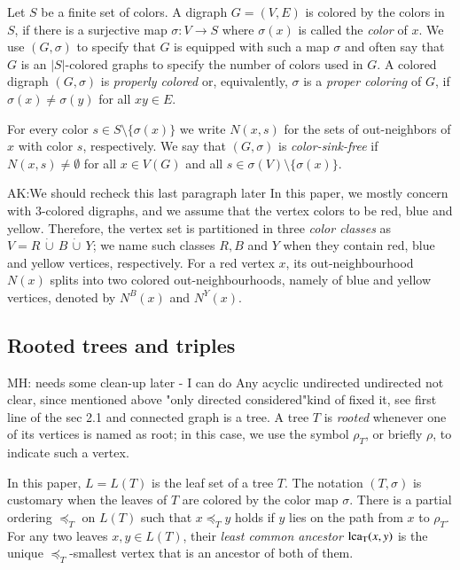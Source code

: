 \documentclass[final,3p,times]{elsarticle}
\newcommand{\TODO}[1]{\begingroup\color{red}#1\endgroup}
\newcommand{\ak}[1]{\begingroup\color{orange}#1\endgroup}
\begin{document}
Let $S$ be a finite set of colors. A digraph $G=(V,E)$ is colored by the colors in $S$,
if there is a surjective map $\sigma: V\to S$ where 
$\sigma(x)$ is called the \emph{color} of $x$. We use $(G,\sigma)$ to specify
that $G$ is equipped with such a map $\sigma$ and often say that $G$ 
is an $|S|$-colored graphs to specify the number of colors used in $G$. 
A colored digraph $(G, \sigma)$ 
is \emph{properly colored} or, equivalently, $\sigma$ is a \emph{proper coloring}
of $G$, if $\sigma(x)\neq \sigma(y)$ for all $xy\in E$. 


For every color $s\in S\setminus \{\sigma(x)\}$
we write $N(x,s)$ for the sets of out-neighbors 
of $x$ with color $s$, respectively. We say that
$(G,\sigma)$ is \emph{color-sink-free} if $N(x,s)\ne\emptyset$ for all
$x\in V(G)$ and all $s\in \sigma(V)\setminus\{\sigma(x)\}$.


\TODO{AK:We should recheck this last paragraph later}
In this paper, we mostly concern with 3-colored digraphs, and we assume that the vertex colors to be red, blue and yellow. Therefore, the vertex set is partitioned in three \emph{color classes} as $V=R\,\dot{\cup}\, B\,\dot{\cup}\, Y$; we name such classes $R,B$ and $Y$ when they contain red, blue and yellow vertices, respectively. For a red vertex $x$, its out-neighbourhood $N(x)$ splits into two colored out-neighbourhoods, namely of blue and yellow vertices, denoted by $N^{B}(x)$ and $N^{Y}(x)$. 

\subsection{Rooted trees and triples} \TODO{MH: needs some clean-up later - I can do}
Any acyclic undirected \TODO{undirected not clear, since mentioned above "only directed considered"}\ak{kind of fixed it, see first line of the sec 2.1} and connected graph is a tree. A tree $T$ is
\emph{rooted} whenever one of its vertices is named as root; in this case, we
use the symbol $\rho_T$, or briefly $\rho$, to indicate such a vertex.  

In this paper, $L=L(T)$ is the leaf set of a tree $T$. The notation $(T,\sigma)$ is customary when the leaves of $T$ are colored by the color map $\sigma$. There is a partial ordering $\preceq_T$ on $L(T)$ such that $x\preceq_T y$ holds if $y$ lies on the path from $x$ to $\rho_T$. For any two leaves $x,y\in L(T)$, their \emph{least common ancestor} ${\rm{lca_T}}(x,y)$ is the unique $\preceq_T$-smallest vertex that is an ancestor of both of them.
\end{document}
